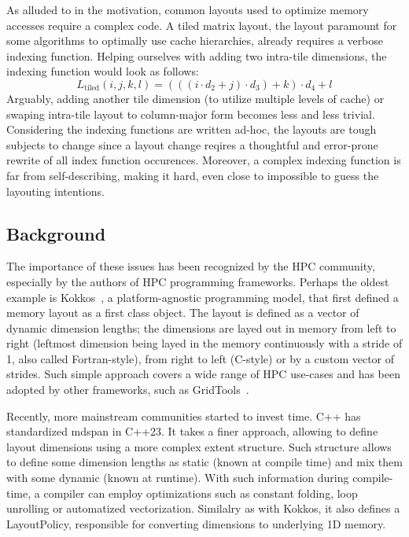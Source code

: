 As alluded to in the motivation, common layouts used to optimize memory accesses require a complex code. A tiled matrix layout, the layout paramount for some algorithms to optimally use cache hierarchies, already requires a verbose indexing function. Helping ourselves with adding two intra-tile dimensions, the indexing function would look as follows:
$$L_{\text{tiled}}(i,j,k,l) = (((i \cdot d_2 + j) \cdot d_3) + k) \cdot d_4 + l$$
Arguably, adding another tile dimension (to utilize multiple levels of cache) or swaping intra-tile layout to column-major form becomes less and less trivial. Considering the indexing functions are written ad-hoc, the layouts are tough subjects to change since a layout change reqires a thoughtful and error-prone rewrite of all index function occurences. Moreover, a complex indexing function is far from self-describing, making it hard, even close to impossible to guess the layouting intentions.

\subsection{Background}

The importance of these issues has been recognized by the HPC community, especially by the authors of HPC programming frameworks. Perhaps the oldest example is Kokkos~\cite{CARTEREDWARDS20143202}, a platform-agnostic programming model, that first defined a memory layout as a first class object. The layout is defined as a vector of dynamic dimension lengths; the dimensions are layed out in memory from left to right (leftmost dimension being layed in the memory continuously with a stride of 1, also called Fortran-style), from right to left (C-style) or by a custom vector of strides. Such simple approach covers a wide range of HPC use-cases and has been adopted by other frameworks, such as GridTools~\cite{AFANASYEV2021100707}.

Recently, more mainstream communities started to invest time. C++ has standardized mdspan in C++23. It takes a finer approach, allowing to define layout dimensions using a more complex extent structure.  Such structure allows to define some dimension lengths as static (known at compile time) and mix them with some dynamic (known at runtime). With such information during compile-time, a compiler can employ optimizations such as constant folding, loop unrolling or automatized vectorization. Similalry as with Kokkos, it also defines a LayoutPolicy, responsible for converting dimensions to underlying 1D memory. 



